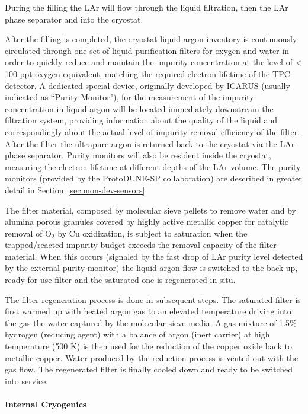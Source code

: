 During the filling the LAr will flow through the liquid filtration, then the LAr phase separator and into the cryostat.

After the filling is completed, the cryostat liquid argon inventory is continuously circulated through one set of liquid purification filters 
for oxygen and water in order to quickly reduce and maintain the impurity concentration at the 
 level of < 100 ppt oxygen equivalent, matching the required electron lifetime of the TPC detector. 
A dedicated special device, originally developed by ICARUS (usually indicated as ``Purity Monitor"), 
for the measurement of the impurity concentration in liquid argon will be located immediately downstream the filtration system, 
providing information about the quality of the liquid and correspondingly about the actual level of impurity removal efficiency of the filter. 
After the filter the ultrapure argon is returned back to the cryostat via the LAr phase separator. 
Purity monitors will also be resident inside the cryostat, measuring the electron lifetime at different depths of the LAr volume.  The purity monitors (provided by the ProtoDUNE-SP collaboration) are described in greater detail in Section~\ref{sec:mon-dev-sensors}.

The filter material, composed by molecular sieve pellets to remove water and by alumina porous granules covered by highly active metallic copper for catalytic removal of O$_2$ by Cu oxidization, is subject to saturation when the trapped/reacted impurity budget exceeds the removal capacity of the filter material. When this occurs (signaled by the 
fast drop of LAr purity level detected by the external purity monitor) the liquid argon flow is switched to the back-up, ready-for-use filter and the saturated one is regenerated in-situ.

The filter regeneration process is done in subsequent steps. The saturated filter is first warmed up with heated argon gas to an elevated temperature driving into the gas the water captured by the molecular sieve media. A gas mixture of 1.5\% hydrogen (reducing agent) with a balance of argon (inert carrier) at high temperature (500 K) is then used for the reduction of the copper oxide back to metallic copper. Water produced by the reduction process is vented out with the gas flow.
The regenerated filter is finally cooled down and ready to be switched into service. 

\paragraph{Internal Cryogenics}


